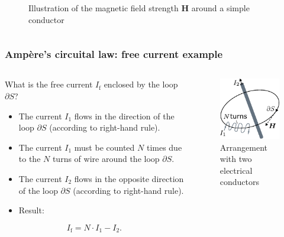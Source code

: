 \begin{frame}
\begin{columns}
\begin{column}{0.4\textwidth}
\begin{figure}
				\caption{Illustration of the magnetic field strength $\bm{H}$ around a simple conductor}
			\end{figure}
		\end{column}
		\end{columns}
\end{frame}

\begin{frame}
	\frametitle{Amp\`ere's circuital law: free current example}
	\begin{columns}
		\begin{column}{0.55\textwidth}
			What is the free current $I_{\mathrm{f}}$ enclosed by the loop $\partial S$?
            \begin{itemize}
                \item The current $I_1$ flows in the direction of the loop $\partial S$ (according to right-hand rule).
                \item The current $I_1$ must be counted $N$ times due to the $N$ turns of wire around the loop $\partial S$.
                \item The current $I_2$ flows in the opposite direction of the loop $\partial S$ (according to right-hand rule).
                \item Result:
            \end{itemize}
            \vspace{0.25cm}
            \begin{equation*}
                I_\mathrm{f} = N \cdot I_1 - I_2.
            \end{equation*}
		\end{column}
        \hfill
		\begin{column}{0.45\textwidth}
			\begin{figure}
				\centering
				\includegraphics[height=0.5\textheight]{fig/lec02/Magnetic_field_strength_multiple_conductors.pdf}
				\caption{Arrangement with two electrical conductors}
			\end{figure}
		\end{column}
		\end{columns}
\end{frame}

